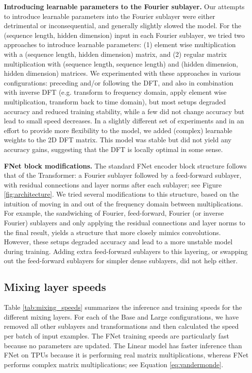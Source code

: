 \documentclass[11pt]{article}
\begin{document}
\textbf{Introducing learnable parameters to the Fourier sublayer.} Our attempts to introduce learnable parameters into the Fourier sublayer were either detrimental or inconsequential, and generally slightly slowed the model. For the (sequence length, hidden dimension) input in each Fourier sublayer, we tried two approaches to introduce learnable parameters: (1) element wise multiplication with a (sequence length, hidden dimension) matrix, and (2) regular matrix multiplication with (sequence length, sequence length) and (hidden dimension, hidden dimension) matrices. We experimented with these approaches in various configurations: preceding and/or following the DFT, and also in combination with inverse DFT (e.g. transform to frequency domain, apply element wise multiplication, transform back to time domain), but most setups degraded accuracy and reduced training stability, while a few did not change accuracy but lead to small speed decreases. In a slightly different set of experiments and in an effort to provide more flexibility to the model, we added (complex) learnable weights to the 2D DFT matrix. This model was stable but did not yield any accuracy gains, suggesting that the DFT is locally optimal in some sense.

\textbf{FNet block modifications.} The standard FNet encoder block structure follows that of the Transformer: a Fourier sublayer followed by a feed-forward sublayer, with residual connections and layer norms after each sublayer; see Figure \ref{fig:architecture}. We tried several modifications to this structure, based on the intuition of moving in and out of the frequency domain between multiplications. For example, the sandwiching of Fourier, feed-forward, Fourier (or inverse Fourier) sublayers and only applying the residual connections and layer norms to the final result, yields a structure that more closely mimics convolutions. However, these setups degraded accuracy and lead to a more unstable model during training. Adding extra feed-forward sublayers to this layering, or swapping out the feed-forward sublayers for simpler dense sublayers, did not help either.




\subsection{Mixing layer speeds}
\label{app:mixing_speeds}

Table \ref{tab:mixing_speeds} summarizes the inference and training speeds for the different mixing layers. For each of the Base and Large configurations, we have removed all other sublayers and transformations and then calculated the speed per batch of input examples. The FNet training speeds are particularly fast because no parameters are updated. The Linear model has faster inference than FNet on TPUs because it is performing real matrix multiplications, whereas FNet performs complex matrix multiplications; see Equation \eqref{eq:vandermonde}.
\end{document}

